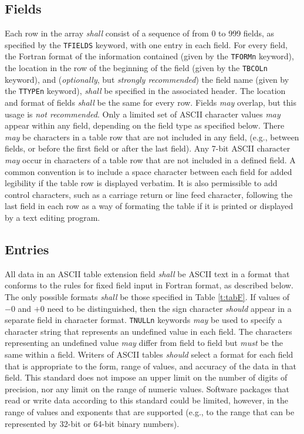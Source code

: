 \documentclass[11pt,makeidx]{book}     %
\begin{document}
   \subsection{Fields}
   Each row in the array {\em shall} consist of a sequence of 
   from 0 to 999 fields, as specified by the {\tt TFIELDS} keyword,
   with one entry in each field.  For every field, the  Fortran \cite{iso04}
   format  of the
   information contained (given by the {\tt TFORMn} keyword), 
   the location in the row of the beginning of the
   field (given by the {\tt TBCOLn} keyword),  
   and ({\em optionally}, but {\em strongly recommended}) the field name 
   (given by the {\tt TTYPEn} keyword), {\em shall}
   be specified in the associated header. The
   location and format of fields {\em shall} be the same for every row.
   Fields {\em may} overlap, but this usage is {\em not recommended}.  
   Only a limited
   set of ASCII character values {\em may} appear within any field, 
   depending on the field type as specified below.
   There {\em may} be characters in a table
   row that are not included in any field, (e.g., between fields, or before
   the first field or after the last field).  
   Any 7-bit ASCII character  {\em may} occur 
   in characters of a table row that are not included in a defined field. 
   A common convention is to include
   a space character between each field for added legibility if the table row
   is displayed verbatim.  It is also permissible to add control characters, such as 
   a carriage return or line feed character, following the last field in each row as a
   way of formating the table if it is printed or displayed by a text editing program.
     
   \subsection{Entries}
   \label{s:ATEntry}
   All data in an ASCII table extension field {\em shall} 
   be ASCII text
   in a format that conforms to the 
   rules for fixed field input in  
   Fortran  \cite{iso04} format, as described below.
   The only possible formats {\em shall} be those specified 
   in Table \ref{t:tabF}.  If values of $-0$ and $+0$ need to be 
   distinguished, then the sign character {\em should} 
   appear in a separate field in character format.  
   {\tt TNULLn} keywords {\em may} be used 
   to specify a character
   string that represents
   an undefined value in each field. The
   characters representing an undefined value {\em may} differ from field
   to field but {\em must} be the same within a field.  
   Writers of ASCII tables {\em should} select a format for each field 
   that is appropriate to the 
   form, range of values, and accuracy of the data in that field. 
This standard does not impose an upper limit on the number of 
digits of precision, nor any limit on the range of numeric 
values. Software packages that read or write 
data according to this standard could be limited, however, in the range of 
values and exponents that are supported (e.g., to the range that 
can be represented by 32-bit or 64-bit binary numbers).
\end{document}
